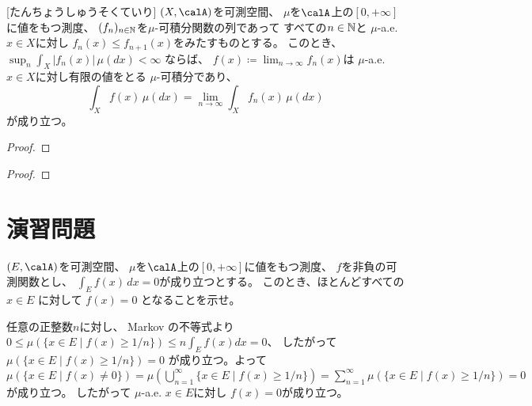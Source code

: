 \documentclass[report]{jlreq}
\begin{document}
\begin{theorem}
    [たんちょうしゅうそくていり]
    $(X, \calA)$を可測空間、
    $\mu$を$\calA$上の$[0, +\infty]$に値をもつ測度、
    $(f_n)_{n \in \mathbb{N}}$を$\mu$-可積分関数の列であって
    すべての$n \in \mathbb{N}$と
    $\mu$-a.e. $x \in X$に対し
    $f_n(x) \le f_{n + 1}(x)$をみたすものとする。
    このとき、
    $\sup_n \int_X |f_n(x)| \, \mu(dx) < \infty$
    ならば、
    $f(x) \coloneqq \lim_{n \to \infty} f_n(x)$は
    $\mu$-a.e. $x \in X$に対し有限の値をとる
    $\mu$-可積分であり、
    \begin{equation}
        \int_X f(x) \, \mu(dx)
            = \lim_{n \to \infty} \int_X f_n(x) \, \mu(dx)
    \end{equation}
    が成り立つ。
\end{theorem}

\begin{proof}
    \TODO{}
\end{proof}

\begin{theorem}
    \TODO{}
\end{theorem}

\begin{proof}
    \TODO{}
\end{proof}

%
\newpage
\section{演習問題}

\begin{problem}[ChatGPT]
    $(E, \calA)$を可測空間、
    $\mu$を$\calA$上の$[0, +\infty]$に値をもつ測度、
    $f$を非負の可測関数とし、
    $\int_E f(x) \, dx = 0$が成り立つとする。
    このとき、ほとんどすべての $x \in E$ に対して
    $f(x) = 0$ となることを示せ。
\end{problem}

\begin{answer}
    任意の正整数$n$に対し、
    Markov の不等式より
    $0 \le \mu(\{ x \in E \mid f(x) \ge 1/n \}) \le n \int_E f(x) dx = 0$、
    したがって
    $\mu(\{ x \in E \mid f(x) \ge 1/n \}) = 0$
    が成り立つ。よって
    $\mu(\{ x \in E \mid f(x) \neq 0 \})
        = \mu(\bigcup_{n = 1}^\infty \{ x \in E \mid f(x) \ge 1/n \})
        = \sum_{n = 1}^\infty \mu(\{ x \in E \mid f(x) \ge 1/n \})
        = 0$
    が成り立つ。
    したがって
    $\mu$-a.e. $x \in E$に対し
    $f(x) = 0$が成り立つ。
\end{answer}
\end{document}
